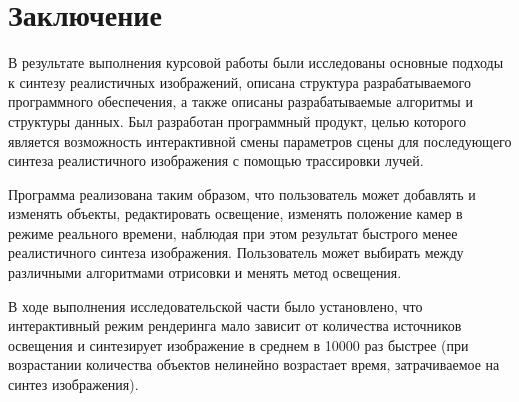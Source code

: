 \chapter*{Заключение}

В результате выполнения курсовой работы были исследованы основные подходы к синтезу реалистичных изображений, описана структура разрабатываемого программного обеспечения, а также описаны разрабатываемые алгоритмы и структуры данных. Был разработан программный продукт, целью которого является возможность интерактивной смены параметров сцены для последующего синтеза реалистичного изображения с помощью трассировки лучей.

Программа реализована таким образом, что пользователь может добавлять и изменять объекты, редактировать освещение, изменять положение камер в режиме реального времени, наблюдая при этом результат быстрого менее реалистичного синтеза изображения. Пользователь может выбирать между различными алгоритмами отрисовки и менять метод освещения.

В ходе выполнения исследовательской части было установлено, что интерактивный режим рендеринга мало зависит от количества источников освещения и синтезирует изображение в среднем в 10000 раз быстрее (при возрастании количества объектов нелинейно возрастает время, затрачиваемое на синтез изображения).